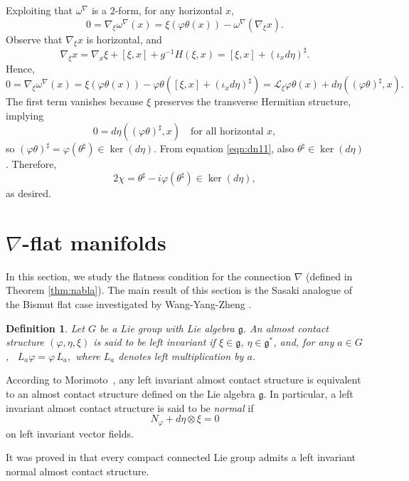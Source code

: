 \documentclass{article}
\makeatletter
\renewenvironment{proof}[1][\proofname]{%
  \par\pushQED{\qed}%
  \normalfont\topsep6\p@\@plus6\p@\relax
  \trivlist
  \item[\hskip\labelsep
        \textbf{\textup{#1}}\@addpunct{.}]\ignorespaces
}{%
  \popQED\endtrivlist\@endpefalse
}
\newtheorem{defn}[thm]{Definition}
\theoremstyle{definition}
\renewcommand{\phi}{\varphi}
\numberwithin{equation}{section}
\makeatother
\begin{document}
\begin{proof}[Proof of Theorem~\ref{thm:CKL}]
\medskip
Exploiting that $\omega^\nabla$ is a $2$-form, for any horizontal \(x\),
\[
0 = \nabla_\xi \omega^\nabla(x) = \xi(\phi\theta(x)) - \omega^\nabla(\nabla_\xi x).
\]
Observe that \(\nabla_\xi x\) is horizontal, and
\[
\nabla_\xi x = \nabla_x \xi + [\xi,x] + g^{-1} H(\xi,x) = [\xi,x] + (\iota_x d\eta)^\sharp.
\]
Hence,
\[
0 = \nabla_\xi \omega^\nabla(x) = \xi(\phi\theta(x)) - \phi\theta([\xi,x] + (\iota_x d\eta)^\sharp) = \mathcal{L}_\xi \phi\theta(x) + d\eta((\phi\theta)^\sharp, x).
\]
The first term vanishes because \(\xi\) preserves the transverse Hermitian structure, implying
\[
0 = d\eta((\phi\theta)^\sharp, x) \quad \text{for all horizontal } x,
\]
so \((\phi\theta)^\sharp = \phi(\theta^\sharp) \in \ker(d\eta)\). From equation \eqref{eqn:dn11}, also \(\theta^\sharp \in \ker(d\eta)\). Therefore,
\[
2\chi = \theta^\sharp - i \phi(\theta^\sharp) \in \ker(d\eta),
\]
as desired.
\end{proof}

\section{\texorpdfstring{$\nabla$}{}-flat manifolds}
In this section, we study the flatness condition for the connection $\nabla$ (defined in Theorem \ref{thm:nabla}). The main result of this section is the Sasaki analogue of the Bismut flat case investigated by Wang-Yang-Zheng \cite{WYZ}. 

\begin{defn}
Let $G$ be a Lie group with Lie algebra $\mathfrak{g}$. An almost contact structure $(\phi, \eta, \xi)$ is said to be \emph{left invariant} if $\xi \in \mathfrak{g}$, $\eta \in \mathfrak{g}^*$, and, for any $a \in G$, \, $ L_a \phi = \phi\, L_a,$ where $L_a$ denotes left multiplication by $a$.
\end{defn}

According to Morimoto~\cite{Mor}, any left invariant almost contact structure is equivalent to an almost contact structure defined on the Lie algebra $\mathfrak{g}$. In particular, a left invariant almost contact structure is said to be \emph{normal} if
\[
    N_\phi + d\eta \otimes \xi = 0
\]
on left invariant vector fields.

It was proved in \cite{Mor} that every compact connected Lie group admits a left invariant normal almost contact structure.
 
\end{document}
